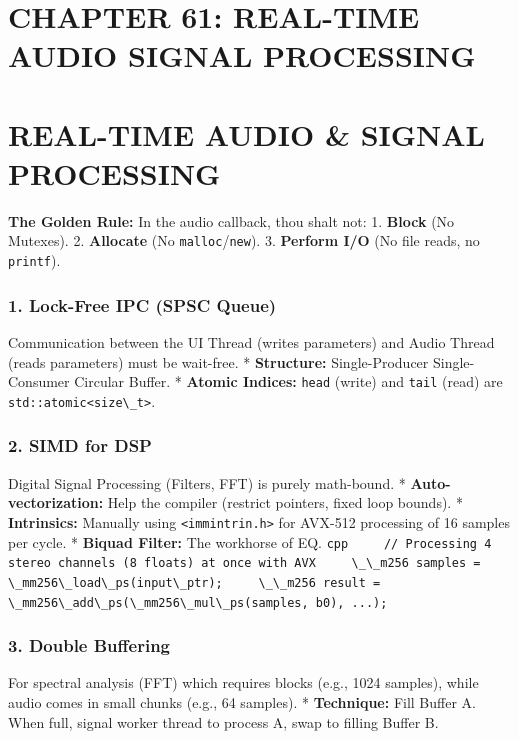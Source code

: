 \hypertarget{chapter-61-real-time-audio-signal-processing}{%
\section{CHAPTER 61: REAL-TIME AUDIO SIGNAL
PROCESSING}\label{chapter-61-real-time-audio-signal-processing}}

\hypertarget{real-time-audio-signal-processing}{%
\section{REAL-TIME AUDIO \& SIGNAL
PROCESSING}\label{real-time-audio-signal-processing}}

\textbf{The Golden Rule:} In the audio callback, thou shalt not: 1.
\textbf{Block} (No Mutexes). 2. \textbf{Allocate} (No
\passthrough{\lstinline!malloc!}/\passthrough{\lstinline!new!}). 3.
\textbf{Perform I/O} (No file reads, no
\passthrough{\lstinline!printf!}).

\hypertarget{lock-free-ipc-spsc-queue}{%
\subsubsection{1. Lock-Free IPC (SPSC
Queue)}\label{lock-free-ipc-spsc-queue}}

Communication between the UI Thread (writes parameters) and Audio Thread
(reads parameters) must be wait-free. * \textbf{Structure:}
Single-Producer Single-Consumer Circular Buffer. * \textbf{Atomic
Indices:} \passthrough{\lstinline!head!} (write) and
\passthrough{\lstinline!tail!} (read) are
\passthrough{\lstinline!std::atomic<size\_t>!}.

\hypertarget{simd-for-dsp}{%
\subsubsection{2. SIMD for DSP}\label{simd-for-dsp}}

Digital Signal Processing (Filters, FFT) is purely math-bound. *
\textbf{Auto-vectorization:} Help the compiler (restrict pointers, fixed
loop bounds). * \textbf{Intrinsics:} Manually using
\passthrough{\lstinline!<immintrin.h>!} for AVX-512 processing of 16
samples per cycle. * \textbf{Biquad Filter:} The workhorse of EQ.
\passthrough{\lstinline!cpp     // Processing 4 stereo channels (8 floats) at once with AVX     \_\_m256 samples = \_mm256\_load\_ps(input\_ptr);     \_\_m256 result = \_mm256\_add\_ps(\_mm256\_mul\_ps(samples, b0), ...);!}

\hypertarget{double-buffering}{%
\subsubsection{3. Double Buffering}\label{double-buffering}}

For spectral analysis (FFT) which requires blocks (e.g., 1024 samples),
while audio comes in small chunks (e.g., 64 samples). *
\textbf{Technique:} Fill Buffer A. When full, signal worker thread to
process A, swap to filling Buffer B.
